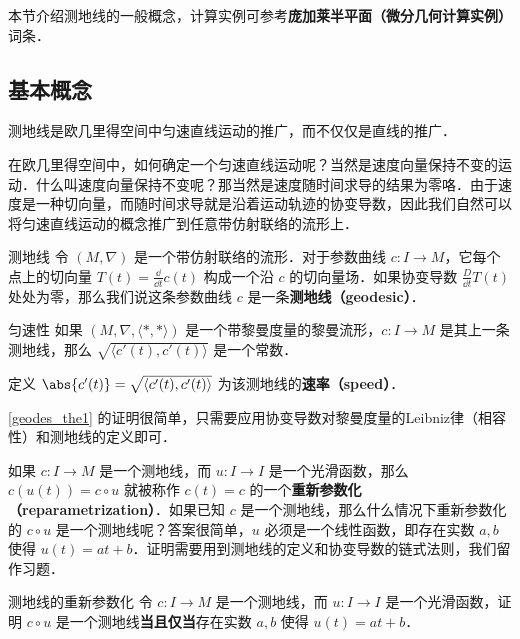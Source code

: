

本节介绍测地线的一般概念，计算实例可参考\textbf{庞加莱半平面（微分几何计算实例）}词条．

\subsection{基本概念}

测地线是欧几里得空间中匀速直线运动的推广，而不仅仅是直线的推广．

在欧几里得空间中，如何确定一个匀速直线运动呢？当然是速度向量保持不变的运动．什么叫速度向量保持不变呢？那当然是速度随时间求导的结果为零咯．由于速度是一种切向量，而随时间求导就是沿着运动轨迹的协变导数，因此我们自然可以将匀速直线运动的概念推广到任意带仿射联络的流形上．

\begin{definition}{测地线}
令 $(M, \nabla)$ 是一个带仿射联络的流形．对于参数曲线 $c:I\to M$，它每个点上的切向量 $T(t)=\frac{\dd}{\dd t}c(t)$ 构成一个沿 $c$ 的切向量场．如果协变导数 $\frac{D}{\dd t}T(t)$ 处处为零，那么我们说这条参数曲线 $c$ 是一条\textbf{测地线（geodesic）}．
\end{definition}

\begin{theorem}{匀速性}\label{geodes_the1}
如果 $(M, \nabla,  \langle *, * \rangle )$ 是一个带黎曼度量的黎曼流形，$c:I\to M$ 是其上一条测地线，那么 $\sqrt{ \langle c'(t), c'(t) \rangle }$ 是一个常数．

定义 $\abs{c'(t)}=\sqrt{ \langle c'(t), c'(t) \rangle }$ 为该测地线的\textbf{速率（speed）}．
\end{theorem}

\autoref{geodes_the1} 的证明很简单，只需要应用协变导数对黎曼度量的Leibniz律（相容性）和测地线的定义即可．



如果 $c:I\to M$ 是一个测地线，而 $u:I\to I$ 是一个光滑函数，那么 $c(u(t))=c\circ u$ 就被称作 $c(t)=c$ 的一个\textbf{重新参数化（reparametrization）}．如果已知 $c$ 是一个测地线，那么什么情况下重新参数化的 $c\circ u$ 是一个测地线呢？答案很简单，$u$ 必须是一个线性函数，即存在实数 $a, b$ 使得 $u(t)=at+b$．证明需要用到测地线的定义和协变导数的链式法则，我们留作习题．

\begin{exercise}{测地线的重新参数化}
令 $c:I\to M$ 是一个测地线，而 $u:I\to I$ 是一个光滑函数，证明 $c\circ u$ 是一个测地线\textbf{当且仅当}存在实数 $a, b$ 使得 $u(t)=at+b$．
\end{exercise}

